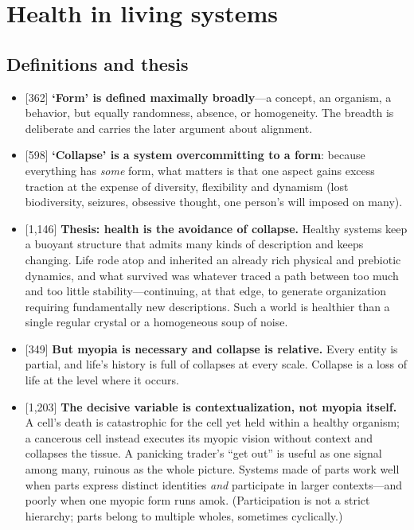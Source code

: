 \documentclass[11pt]{article}
\newcommand{\ct}[1]{{\footnotesize\color{black!55}[#1]}\hspace{1pt}}
\begin{document}
\section{Health in living systems}

\subsection*{Definitions and thesis}

\begin{itemize}
  \item \ct{362} \textbf{`Form' is defined maximally broadly}---a concept, an organism, a behavior, but equally randomness, absence, or homogeneity. The breadth is deliberate and carries the later argument about alignment.
  \item \ct{598} \textbf{`Collapse' is a system overcommitting to a form}: because everything has \emph{some} form, what matters is that one aspect gains excess traction at the expense of diversity, flexibility and dynamism (lost biodiversity, seizures, obsessive thought, one person's will imposed on many).
  \item \ct{1,146} \textbf{Thesis: health is the avoidance of collapse.} Healthy systems keep a buoyant structure that admits many kinds of description and keeps changing. Life rode atop and inherited an already rich physical and prebiotic dynamics, and what survived was whatever traced a path between too much and too little stability---continuing, at that edge, to generate organization requiring fundamentally new descriptions. Such a world is healthier than a single regular crystal or a homogeneous soup of noise.
  \item \ct{349} \textbf{But myopia is necessary and collapse is relative.} Every entity is partial, and life's history is full of collapses at every scale. Collapse is a loss of life at the level where it occurs.
  \item \ct{1,203} \textbf{The decisive variable is contextualization, not myopia itself.} A cell's death is catastrophic for the cell yet held within a healthy organism; a cancerous cell instead executes its myopic vision without context and collapses the tissue. A panicking trader's ``get out'' is useful as one signal among many, ruinous as the whole picture. Systems made of parts work well when parts express distinct identities \emph{and} participate in larger contexts---and poorly when one myopic form runs amok. (Participation is not a strict hierarchy; parts belong to multiple wholes, sometimes cyclically.)
\end{itemize}
\end{document}

